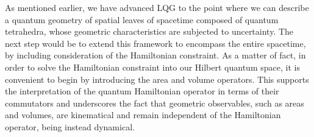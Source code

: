 






  
  


    

    

    
As mentioned earlier, we have advanced LQG to the point where we can describe a quantum geometry of spatial leaves of spacetime composed of quantum tetrahedra, whose geometric characteristics are subjected to uncertainty. The next step would be to extend this framework to encompass the entire spacetime, by including consideration of the Hamiltonian constraint. {As a matter of fact, in order to solve the Hamiltonian constraint into our Hilbert quantum space, it is convenient to begin by introducing the area and volume operators. This supports the interpretation of the quantum Hamiltonian operator in terms of their commutators and underscores the fact that geometric observables, such as areas and volumes, are kinematical and remain independent of the Hamiltonian operator, being instead dynamical.}

